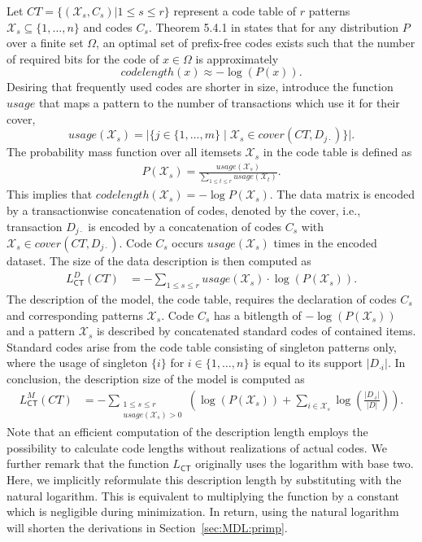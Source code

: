 Let $CT=\{(\mathcal{X}_s,C_s)\vert  1\leq s\leq r\}$ represent a code table of $r$ patterns $\mathcal{X}_s\subseteq\{1,\ldots,n\}$ and codes $C_s$. Theorem 5.4.1 in \cite{cover2012elements} states that for any distribution $P$ over a finite set $\Omega$, an optimal set of prefix-free codes exists such that the number of required bits for the code of $x\in\Omega$ is approximately
\begin{equation*}
	codelength(x) \approx -\log(P(x)).
\end{equation*}
Desiring that frequently used codes are shorter in size, \cite{siebes2006item} introduce the function $usage$ that maps a pattern to the number of transactions which use it for their cover,
\[usage(\mathcal{X}_s)=\lvert  \{j\in\{1,\ldots,m\}\mid \mathcal{X}_s\in cover(CT,D_{j\cdot})\}\rvert .\] 
The probability mass function over all itemsets $\mathcal{X}_s$ in the code table  is defined as
\begin{align}\label{eq:krimpCodeProb}
P(\mathcal{X}_s) = \frac{usage(\mathcal{X}_s)}{\sum_{1\leq t \leq r}usage(\mathcal{X}_t)}.
\end{align}
This implies that $codelength(\mathcal{X}_s)=-\log P(\mathcal{X}_s)$. The data matrix is encoded by a transactionwise concatenation of codes, denoted by the cover, i.e., transaction $D_{j\cdot}$ is encoded by a concatenation of codes $C_s$ with $\mathcal{X}_s\in cover(CT,D_{j\cdot})$. Code $C_s$ occurs $usage(\mathcal{X}_s)$ times in the encoded dataset. The size of the data description is then computed as
\begin{align*}
	L^D_{\mathsf{CT}}(CT)
    &=-\sum_{1\leq s\leq r} usage(\mathcal{X}_s) \cdot \log(P(\mathcal{X}_s)).
\end{align*}
The description of the model, the code table, requires the declaration of codes $C_s$ and corresponding patterns $\mathcal{X}_s$. Code $C_s$ has a bitlength of $-\log\left(P(\mathcal{X}_s)\right)$ and a pattern $\mathcal{X}_s$ is described by concatenated standard codes of contained items. Standard codes arise from the code table consisting of singleton patterns only, where the usage of singleton $\{i\}$ for $i\in\{1,\ldots,n\}$ is equal to its support $\lvert D_{\cdot i}\rvert $. In conclusion, the description size of the model is computed as  
\begin{align*}
	L_{\mathsf{CT}}^M(CT)
    &= -\sum_{\substack{1\leq s\leq r \\ usage(\mathcal{X}_s)>0}}\left(\log\left(P(\mathcal{X}_s)\right) +\sum_{i\in \mathcal{X}_s}\log\left(\frac{\lvert D_{\cdot i}\rvert }{\lvert D\rvert }\right)\right).
\end{align*}
Note that an efficient computation of the description length employs the possibility to calculate code lengths without realizations of actual codes.
We further remark that the function $L_{\mathsf{CT}}$ originally uses the logarithm with base two. Here, we implicitly reformulate this description length by substituting with the natural logarithm. This is equivalent to multiplying the function by a constant which is negligible during minimization. In return, using the natural logarithm will shorten the derivations in Section~\ref{sec:MDL:primp}.

